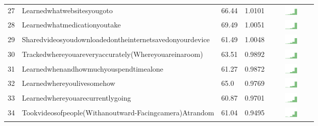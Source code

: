 \documentclass[a4paper,12pt]{article}
\begin{document}
\begin{longtable}{| p{0.5cm} | p{7cm} | p{1cm} |p{1cm} | c |}
27 & Learnedwhatwebsitesyougoto & 66.44 & 1.0101&\includegraphics[width = 2cm, height = 0.5cm]{tables/learnedwhatwebsitesyougotocombined} \\ 
28 & Learnedwhatmedicationyoutake & 69.49 & 1.0051&\includegraphics[width = 2cm, height = 0.5cm]{tables/learnedwhatmedicationyoutakecombined} \\ 
29 & Sharedvideosyoudownloadedontheinternetsavedonyourdevice & 61.49 & 1.0048&\includegraphics[width = 2cm, height = 0.5cm]{tables/sharedvideosyoudownloadedontheinternetsavedonyourdevicecombined} \\ 
30 & Trackedwhereyouareveryaccurately(Whereyouareinaroom) & 63.51 & 0.9892&\includegraphics[width = 2cm, height = 0.5cm]{tables/trackedwhereyouareveryaccurately(whereyouareinaroom)combined} \\ 
31 & Learnedwhenandhowmuchyouspendtimealone & 61.27 & 0.9872&\includegraphics[width = 2cm, height = 0.5cm]{tables/learnedwhenandhowmuchyouspendtimealonecombined} \\ 
32 & Learnedwhereyoulivesomehow & 65.0 & 0.9769&\includegraphics[width = 2cm, height = 0.5cm]{tables/learnedwhereyoulivesomehowcombined} \\ 
33 & Learnedwhereyouarecurrentlygoing & 60.87 & 0.9701&\includegraphics[width = 2cm, height = 0.5cm]{tables/learnedwhereyouarecurrentlygoingcombined} \\ 
34 & Tookvideosofpeople(Withanoutward-Facingcamera)Atrandom & 61.04 & 0.9495&\includegraphics[width = 2cm, height = 0.5cm]{tables/tookvideosofpeople(withanoutward-facingcamera)atrandomcombined} \\ 

\end{longtable}
\end{document}
